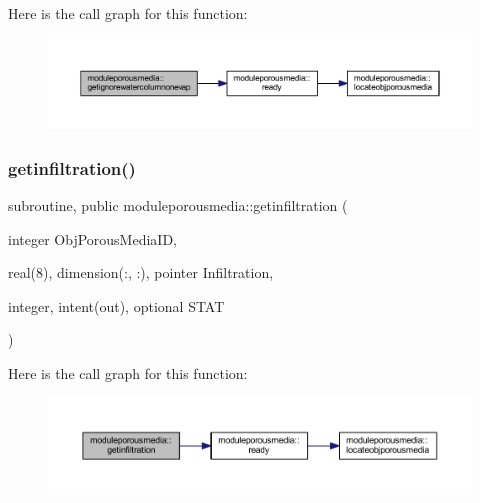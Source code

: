 Here is the call graph for this function\+:\nopagebreak
\begin{figure}[H]
\begin{center}
\leavevmode
\includegraphics[width=350pt]{namespacemoduleporousmedia_ab3b8a6941c7523cd30e46b5a95be57de_cgraph}
\end{center}
\end{figure}
\mbox{\label{namespacemoduleporousmedia_ad1bd34c459069a631831974e49b7bb8c}} 
\subsubsection{\texorpdfstring{getinfiltration()}{getinfiltration()}}
{\footnotesize\ttfamily subroutine, public moduleporousmedia\+::getinfiltration (\begin{DoxyParamCaption}\item[{integer}]{Obj\+Porous\+Media\+ID,  }\item[{real(8), dimension(\+:, \+:), pointer}]{Infiltration,  }\item[{integer, intent(out), optional}]{S\+T\+AT }\end{DoxyParamCaption})}

Here is the call graph for this function\+:\nopagebreak
\begin{figure}[H]
\begin{center}
\leavevmode
\includegraphics[width=350pt]{namespacemoduleporousmedia_ad1bd34c459069a631831974e49b7bb8c_cgraph}
\end{center}
\end{figure}
\mbox{\label{namespacemoduleporousmedia_ae9d86bed181ca34fa5ffb39235e588fc}} 

